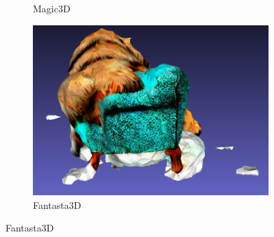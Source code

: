 \begin{figure}[ht]
\begin{subfigure}[b]{0.3\textwidth}
        \caption{Magic3D}
        \vspace{0.1cm}
    \end{subfigure}
    \begin{subfigure}[b]{0.34\textwidth}
        \centering
        \includegraphics[width=\textwidth]{etc/a high-quality rendering of a big dog sleeping on a chair/fantasia3d/fantasia_dog_back_result.png}
        \caption{Fantasta3D}
        \vspace{0.1cm}
    \end{subfigure}


\end{figure}
